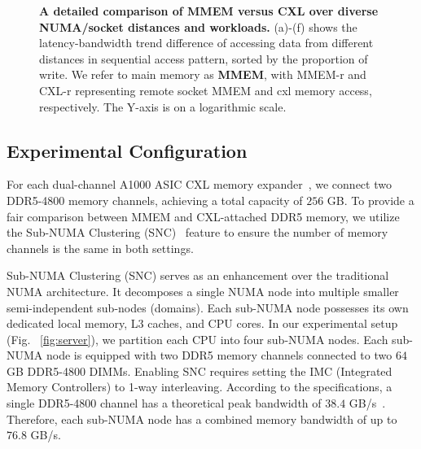 \begin{figure}[t]
{  \label{fig:writeonly}}%
 \caption{\textbf{A detailed comparison of MMEM versus CXL over diverse NUMA/socket distances and workloads.} (a)-(f) shows the latency-bandwidth trend difference of accessing data from different distances in sequential access pattern, sorted by the proportion of write. We refer to main memory as \textbf{MMEM}, with MMEM-r and CXL-r representing remote socket MMEM and cxl memory access, respectively. The Y-axis is on a logarithmic scale.}
\label{fig:microbench-2}
\end{figure}

\subsection{Experimental Configuration}
\label{ssec:config}
For each dual-channel A1000 ASIC CXL memory expander~\cite{A1000}, we connect two DDR5-4800 memory channels, achieving a total capacity of $256$ GB. To provide a fair comparison between MMEM and CXL-attached DDR5 memory, we utilize the Sub-NUMA Clustering (SNC)~\cite{snc} feature to ensure the number of memory channels is the same in both settings. 

 Sub-NUMA Clustering (SNC) serves as an enhancement over the traditional NUMA architecture. It decomposes a single NUMA node into multiple smaller semi-independent sub-nodes (domains). Each sub-NUMA node possesses its own dedicated local memory, L3 caches, and CPU cores. In our experimental setup (Fig. ~\ref{fig:server}), we partition each CPU into four sub-NUMA nodes. Each sub-NUMA node is equipped with two DDR5 memory channels connected to two $64$ GB DDR5-4800 DIMMs. Enabling SNC requires setting the IMC (Integrated Memory Controllers) to 1-way interleaving. According to the specifications, a single DDR5-4800 channel has a theoretical peak bandwidth of $38.4$ GB/s~\cite{cxlcentric}. Therefore, each sub-NUMA node has a combined memory bandwidth of up to $76.8$ GB/s.

